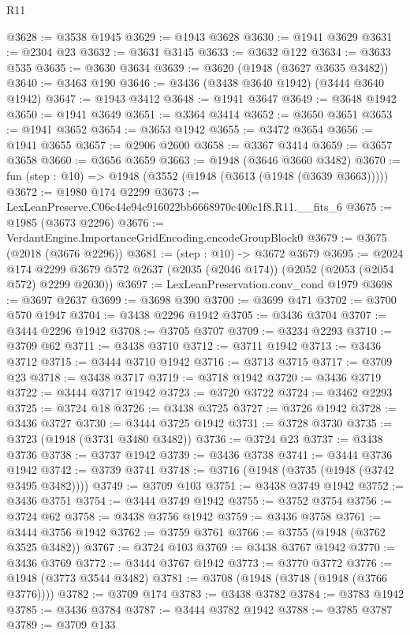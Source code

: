 \begin{lexlean}{R11}
\begin{coremodule}
@3628 := @3538 @1945
@3629 := @1943 @3628
@3630 := @1941 @3629
@3631 := @2304 @23
@3632 := @3631 @3145
@3633 := @3632 @122
@3634 := @3633 @535
@3635 := @3630 @3634
@3639 := @3620 (@1948 (@3627 @3635 @3482))
@3640 := @3463 @190
@3646 := @3436 (@3438 @3640 @1942) (@3444 @3640 @1942)
@3647 := @1943 @3412
@3648 := @1941 @3647
@3649 := @3648 @1942
@3650 := @1941 @3649
@3651 := @3364 @3414
@3652 := @3650 @3651
@3653 := @1941 @3652
@3654 := @3653 @1942
@3655 := @3472 @3654
@3656 := @1941 @3655
@3657 := @2906 @2600
@3658 := @3367 @3414
@3659 := @3657 @3658
@3660 := @3656 @3659
@3663 := @1948 (@3646 @3660 @3482)
@3670 := fun (step : @10) => @1948 (@3552 (@1948 (@3613 (@1948 (@3639 @3663)))))
@3672 := @1980 @174 @2299
@3673 := LexLeanPreserve.C06c44e94c916022bb6668970c400c1f8.R11.__fits_6
@3675 := @1985 (@3673 @2296)
@3676 := VerdantEngine.ImportanceGridEncoding.encodeGroupBlock0
@3679 := @3675 (@2018 (@3676 @2296))
@3681 := (step : @10) -> @3672 @3679
@3695 := @2024
    @174
    @2299
    @3679
    @572
    @2637
    (@2035 (@2046 @174))
    (@2052 (@2053 (@2054 @572) @2299 @2030))
@3697 := LexLeanPreservation.conv_cond @1979
@3698 := @3697 @2637
@3699 := @3698 @390
@3700 := @3699 @471
@3702 := @3700 @570 @1947
@3704 := @3438 @2296 @1942
@3705 := @3436 @3704
@3707 := @3444 @2296 @1942
@3708 := @3705 @3707
@3709 := @3234 @2293
@3710 := @3709 @62
@3711 := @3438 @3710
@3712 := @3711 @1942
@3713 := @3436 @3712
@3715 := @3444 @3710 @1942
@3716 := @3713 @3715
@3717 := @3709 @23
@3718 := @3438 @3717
@3719 := @3718 @1942
@3720 := @3436 @3719
@3722 := @3444 @3717 @1942
@3723 := @3720 @3722
@3724 := @3462 @2293
@3725 := @3724 @18
@3726 := @3438 @3725
@3727 := @3726 @1942
@3728 := @3436 @3727
@3730 := @3444 @3725 @1942
@3731 := @3728 @3730
@3735 := @3723 (@1948 (@3731 @3480 @3482))
@3736 := @3724 @23
@3737 := @3438 @3736
@3738 := @3737 @1942
@3739 := @3436 @3738
@3741 := @3444 @3736 @1942
@3742 := @3739 @3741
@3748 := @3716 (@1948 (@3735 (@1948 (@3742 @3495 @3482))))
@3749 := @3709 @103
@3751 := @3438 @3749 @1942
@3752 := @3436 @3751
@3754 := @3444 @3749 @1942
@3755 := @3752 @3754
@3756 := @3724 @62
@3758 := @3438 @3756 @1942
@3759 := @3436 @3758
@3761 := @3444 @3756 @1942
@3762 := @3759 @3761
@3766 := @3755 (@1948 (@3762 @3525 @3482))
@3767 := @3724 @103
@3769 := @3438 @3767 @1942
@3770 := @3436 @3769
@3772 := @3444 @3767 @1942
@3773 := @3770 @3772
@3776 := @1948 (@3773 @3544 @3482)
@3781 := @3708 (@1948 (@3748 (@1948 (@3766 @3776))))
@3782 := @3709 @174
@3783 := @3438 @3782
@3784 := @3783 @1942
@3785 := @3436 @3784
@3787 := @3444 @3782 @1942
@3788 := @3785 @3787
@3789 := @3709 @133

\end{coremodule}
\end{lexlean}
